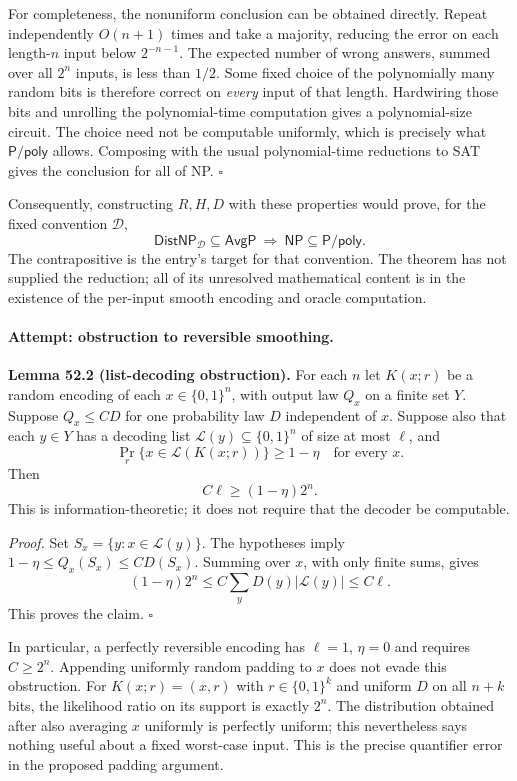 \documentclass[11pt]{article}
\begin{document}
For completeness, the nonuniform conclusion can be obtained directly.
Repeat independently $O(n+1)$ times and take a majority, reducing the
error on each length-$n$ input below $2^{-n-1}$. The expected number of
wrong answers, summed over all $2^n$ inputs, is less than $1/2$. Some fixed
choice of the polynomially many random bits is therefore correct on
\emph{every} input of that length. Hardwiring those bits and unrolling the
polynomial-time computation gives a polynomial-size circuit. The choice
need not be computable uniformly, which is precisely what
$\mathsf{P/poly}$ allows. Composing with the usual polynomial-time
reductions to SAT gives the conclusion for all of NP. \hfill$\square$

Consequently, constructing $R,H,D$ with these properties would prove,
for the fixed convention $\mathcal D$,
\begin{equation}\label{ra:52:conditional}
 \mathsf{DistNP}_{\mathcal D}\subseteq\mathsf{AvgP}
 \ \Longrightarrow\ \mathsf{NP}\subseteq\mathsf{P/poly}.
\end{equation}
The contrapositive is the entry's target for that convention. The theorem
has not supplied the reduction; all of its unresolved mathematical content
is in the existence of the per-input smooth encoding and oracle computation.

\paragraph{Attempt: obstruction to reversible smoothing.}
\textbf{Lemma 52.2 (list-decoding obstruction).} For each $n$ let $K(x;r)$
be a random encoding of each $x\in\{0,1\}^n$, with output law $Q_x$ on a
finite set $Y$. Suppose $Q_x\le C D$ for one probability law $D$ independent
of $x$. Suppose also that each $y\in Y$ has a decoding list
$\mathcal L(y)\subseteq\{0,1\}^n$ of size at most $\ell$, and
\[
 \Pr_r\{x\in\mathcal L(K(x;r))\}\ge1-\eta
 \quad\text{for every }x.
\]
Then
\begin{equation}\label{ra:52:listbound}
 C\ell\ge (1-\eta)2^n.
\end{equation}
This is information-theoretic; it does not require that the decoder be
computable.

\textit{Proof.} Set $S_x=\{y:x\in\mathcal L(y)\}$. The hypotheses imply
$1-\eta\le Q_x(S_x)\le C D(S_x)$. Summing over $x$, with only finite sums,
gives
\[
 (1-\eta)2^n\le C\sum_y D(y)|\mathcal L(y)|\le C\ell.
\]
This proves the claim. \hfill$\square$

In particular, a perfectly reversible encoding has $\ell=1$, $\eta=0$
and requires $C\ge2^n$. Appending uniformly random padding to $x$ does
not evade this obstruction. For $K(x;r)=(x,r)$ with $r\in\{0,1\}^k$ and
uniform $D$ on all $n+k$ bits, the likelihood ratio on its support is
exactly $2^n$. The distribution obtained after also averaging $x$
uniformly is perfectly uniform; this nevertheless says nothing useful
about a fixed worst-case input. This is the precise quantifier error in
the proposed padding argument.
\end{document}

